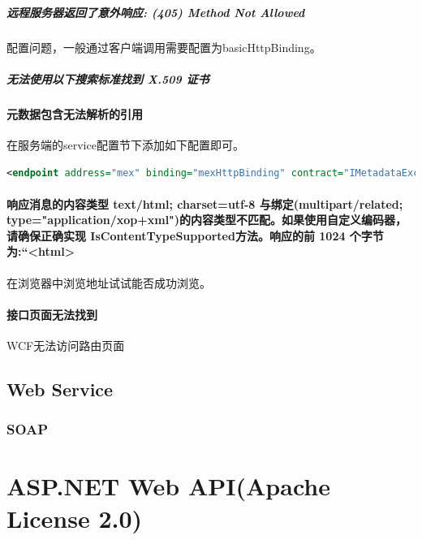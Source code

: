 \documentclass{book}
\begin{document}
\paragraph{远程服务器返回了意外响应: (405) Method Not Allowed}

配置问题，一般通过客户端调用需要配置为basicHttpBinding。

\paragraph{无法使用以下搜索标准找到 X.509 证书}

\subsubsection{元数据包含无法解析的引用}

在服务端的service配置节下添加如下配置即可。

\begin{lstlisting}[language=XML]
<endpoint address="mex" binding="mexHttpBinding" contract="IMetadataExchange" />
\end{lstlisting}

\subsubsection{响应消息的内容类型 text/html; charset=utf-8 与绑定(multipart/related; type="application/xop+xml")的内容类型不匹配。如果使用自定义编码器，请确保正确实现 IsContentTypeSupported方法。响应的前 1024 个字节为:“<html>}

在浏览器中浏览地址试试能否成功浏览。

\subsubsection{接口页面无法找到}

WCF无法访问路由页面

\section{Web Service}

\subsection{SOAP}



\chapter{ASP.NET Web API(Apache License 2.0)}
\end{document}
